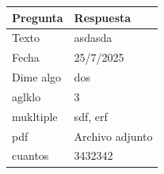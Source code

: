 \documentclass{article}
\begin{document}
\begin{longtable}{|p{}|p{}|}
\hline
\rowcolor{lightgray} \textbf{Pregunta} & \textbf{Respuesta} \\
\hline
\endhead

Texto & 
\begin{minipage}[t]{0.55\textwidth}
asdasda
\end{minipage} \\
\hline

Fecha & 
\begin{minipage}[t]{0.55\textwidth}
25/7/2025
\end{minipage} \\
\hline

Dime algo & 
\begin{minipage}[t]{0.55\textwidth}
dos
\end{minipage} \\
\hline

aglklo & 
\begin{minipage}[t]{0.55\textwidth}
3
\end{minipage} \\
\hline

mukltiple & 
\begin{minipage}[t]{0.55\textwidth}
sdf, erf
\end{minipage} \\
\hline

pdf & 
\begin{minipage}[t]{0.55\textwidth}
Archivo adjunto
\end{minipage} \\
\hline

cuantos & 
\begin{minipage}[t]{0.55\textwidth}
3432342
\end{minipage} \\
\hline

\end{longtable}
\vspace{1cm}
\end{document}
